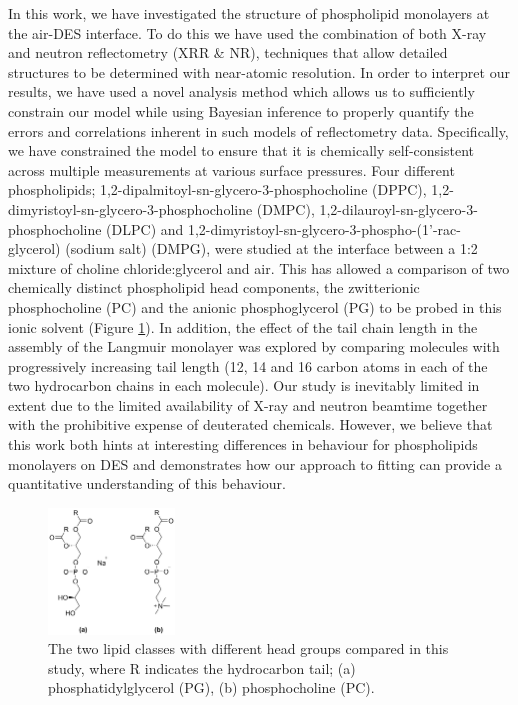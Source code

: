 \documentclass[amsmath,amssymb,twocolumn,superscriptaddress]{revtex4-1}
\begin{document}
In this work, we have investigated the structure of phospholipid monolayers at the air-DES interface.
To do this we have used the combination of both X-ray and neutron reflectometry (XRR \& NR), techniques that allow detailed structures to be determined with near-atomic resolution.
In order to interpret our results, we have used a novel analysis method which allows us to sufficiently constrain our model while using Bayesian inference \cite{abeles_sur_1948, parratt_surface_1954} to properly quantify the errors and correlations inherent in such models of reflectometry data.
Specifically, we have constrained the model to ensure that it is chemically self-consistent across multiple measurements at various surface pressures.
Four different phospholipids; 1,2-dipalmitoyl-sn-glycero-3-phosphocholine (DPPC), 1,2-dimyristoyl-sn-glycero-3-phosphocholine (DMPC),  1,2-dilauroyl-sn-glycero-3-phosphocholine (DLPC) and 1,2-dimyristoyl-sn-glycero-3-phospho-(1'-rac-glycerol) (sodium salt) (DMPG), were studied at the interface between a 1:2 mixture of choline chloride:glycerol and air.
This has allowed a comparison of two chemically distinct phospholipid head components, the zwitterionic phosphocholine (PC) and the anionic phosphoglycerol (PG) to be probed in this ionic solvent (Figure \ref{fig:heads}).
In addition, the effect of the tail chain length in the assembly of the Langmuir monolayer was explored by comparing molecules with progressively increasing tail length (12, 14 and 16 carbon atoms in each of the two hydrocarbon chains in each molecule).
Our study is inevitably limited in extent due to the limited availability of X-ray and neutron beamtime together with the prohibitive expense of deuterated chemicals. However, we believe that this work both hints at interesting differences in behaviour for phospholipids monolayers on DES and demonstrates how our approach to fitting can provide a quantitative understanding of this behaviour.
%
\begin{figure}
\includegraphics[width=0.3\textwidth]{figures/head_groups}
\caption{\label{fig:heads}\small The two lipid classes with different head
groups compared in this study, where R indicates the hydrocarbon tail;
(a) phosphatidylglycerol (PG), (b) phosphocholine (PC).}
\end{figure}
%
\end{document}
